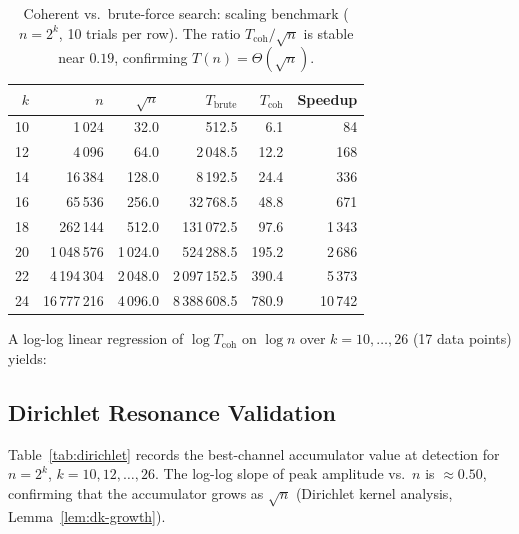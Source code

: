 \documentclass[12pt,a4paper]{article}
\theoremstyle{plain}
\theoremstyle{definition}
\theoremstyle{remark}
\begin{document}
\begin{table}[ht]
\centering
\caption{Coherent vs.\ brute-force search: scaling benchmark ($n = 2^k$,
10 trials per row).  The ratio $T_{\text{coh}}/\sqrt{n}$ is stable near
$0.19$, confirming $T(n) = \Theta(\sqrt{n})$.}
\label{tab:scaling}
\begin{tabular}{@{}rrrrrr@{}}
\toprule
$k$ & $n$ & $\sqrt{n}$ & $T_{\text{brute}}$ & $T_{\text{coh}}$ & Speedup \\
\midrule
10 &      1\,024 &    32.0 &    512.5 &   6.1 &   84 \\
12 &      4\,096 &    64.0 &  2\,048.5 &  12.2 &  168 \\
14 &     16\,384 &   128.0 &  8\,192.5 &  24.4 &  336 \\
16 &     65\,536 &   256.0 & 32\,768.5 &  48.8 &  671 \\
18 &    262\,144 &   512.0 &    131\,072.5 &  97.6 & 1\,343 \\
20 &  1\,048\,576 & 1\,024.0 &   524\,288.5 & 195.2 & 2\,686 \\
22 &  4\,194\,304 & 2\,048.0 & 2\,097\,152.5 & 390.4 & 5\,373 \\
24 & 16\,777\,216 & 4\,096.0 & 8\,388\,608.5 & 780.9 & 10\,742 \\
\bottomrule
\end{tabular}
\end{table}

A log-log linear regression of $\log T_{\text{coh}}$ on $\log n$ over
$k=10,\ldots,26$ (17 data points) yields:

\begin{center}
\end{center}

\subsection{Dirichlet Resonance Validation}

Table~\ref{tab:dirichlet} records the best-channel accumulator value at
detection for $n = 2^k$, $k = 10,12,\ldots,26$.  The log-log slope of
peak amplitude vs.\ $n$ is $\approx 0.50$, confirming that the accumulator
grows as $\sqrt{n}$ (Dirichlet kernel analysis, Lemma~\ref{lem:dk-growth}).
\end{document}
